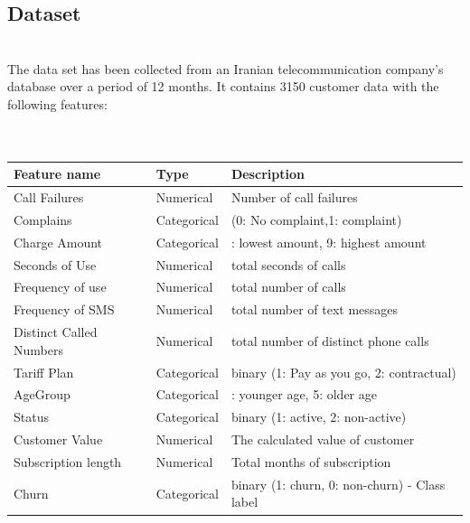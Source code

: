 \documentclass[a4paper, 10pt, conference]{ieeeconf}      %
\begin{document}
\subsection{\textbf{Dataset}}
\\The data set has been collected from an Iranian telecommunication company’s database over a period of 12 months. It contains 3150 customer data with the following features:
\\
\\\
\begin{tabularx}{0.45\textwidth} { 
  | >{\centering}X 
  | >{\centering}X 
  | >{\raggedright\arraybackslash}X | }
 \hline
 \textbf{Feature name} &\textbf {Type} & \textbf {Description} \\
 \hline
Call Failures & Numerical & Number of call failures \\
 \hline
Complains & Categorical & (0: No complaint,1: complaint) \\ 
\hline
Charge Amount & Categorical & 0: lowest amount, 9: highest amount \\
\hline
Seconds of Use & Numerical & total seconds of calls \\
\hline
Frequency of use & Numerical & total number of calls \\
\hline
Frequency of SMS & Numerical & total number of text messages \\
\hline
Distinct Called Numbers & Numerical & total number of distinct phone calls \\
\hline
Tariff Plan & Categorical & binary (1: Pay as you go, 2: contractual) \\
\hline
AgeGroup & Categorical & 1: younger age, 5: older age \\
\hline
Status & Categorical & binary (1: active, 2: non-active) \\
\hline
Customer Value & Numerical & The calculated value of customer \\
\hline
Subscription length & Numerical &  Total months of subscription \\
\hline
Churn & Categorical & binary (1: churn, 0: non-churn) - Class label \\
\hline
\end{tabularx}
\end{document}
